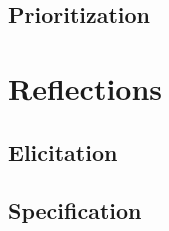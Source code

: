 \documentclass[10pt,a4paper]{article}
\begin{document}
\subsection{Prioritization}



\section{Reflections}

\subsection{Elicitation}

\subsection{Specification}
\end{document}
